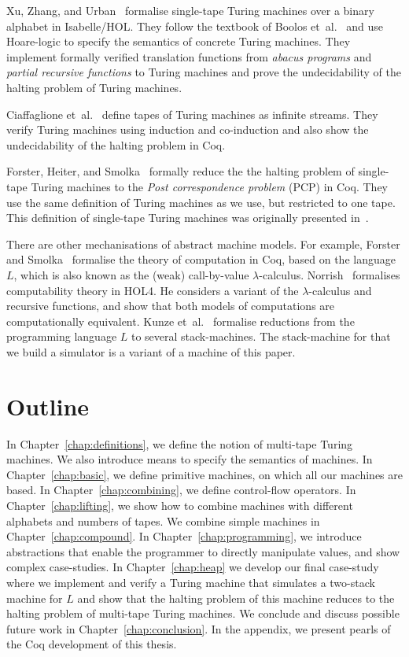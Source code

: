 Xu, Zhang, and Urban~\cite{xu2013} formalise single-tape Turing machines over a binary alphabet in Isabelle/HOL.  They follow the textbook of Boolos
et~al.~\cite{boolos2007computability} and use Hoare-logic to specify the semantics of concrete Turing machines.  They implement formally verified
translation functions from \textit{abacus programs} and \textit{partial recursive functions} to Turing machines and prove the undecidability of the
halting problem of Turing machines.

Ciaffaglione et~al.~\cite{ciaffaglione2016} define tapes of Turing machines as infinite streams.  They verify Turing machines using induction and
co-induction and also show the undecidability of the halting problem in Coq.

Forster, Heiter, and Smolka~\cite{PCPITP} formally reduce the the halting problem of single-tape Turing machines to the \textit{Post correspondence
  problem} (PCP) in Coq.  They use the same definition of Turing machines as we use, but restricted to one tape.  This definition of single-tape
Turing machines was originally presented in~\cite{asperti2012}.

There are other mechanisations of abstract machine models.  For example, Forster and Smolka~\cite{forster2017weak} formalise the theory of computation
in Coq, based on the language~$L$, which is also known as the (weak) call-by-value $\lambda$-calculus.  Norrish~\cite{norrish2011mechanised}
formalises computability theory in HOL4.  He considers a variant of the $\lambda$-calculus and recursive functions, and show that both models of
computations are computationally equivalent.  Kunze et~al.~\cite{KunzeEtAl:2018:Formal} formalise reductions from the programming language $L$ to
several stack-machines.  The stack-machine for that we build a simulator is a variant of a machine of this paper.



\section{Outline}
\label{sec:outline}

In Chapter~\ref{chap:definitions}, we define the notion of multi-tape Turing machines.  We also introduce means to specify the semantics of machines.
In Chapter~\ref{chap:basic}, we define primitive machines, on which all our machines are based.  In Chapter~\ref{chap:combining}, we define
control-flow operators.  In Chapter~\ref{chap:lifting}, we show how to combine machines with different alphabets and numbers of tapes.  We combine
simple machines in Chapter~\ref{chap:compound}.  In Chapter~\ref{chap:programming}, we introduce abstractions that enable the programmer to directly
manipulate values, and show complex case-studies.  In Chapter~\ref{chap:heap} we develop our final case-study where we implement and verify a Turing
machine that simulates a two-stack machine for $L$ and show that the halting problem of this machine reduces to the halting problem of multi-tape
Turing machines.  We conclude and discuss possible future work in Chapter~\ref{chap:conclusion}.  In the appendix, we present pearls of the Coq
development of this thesis.

